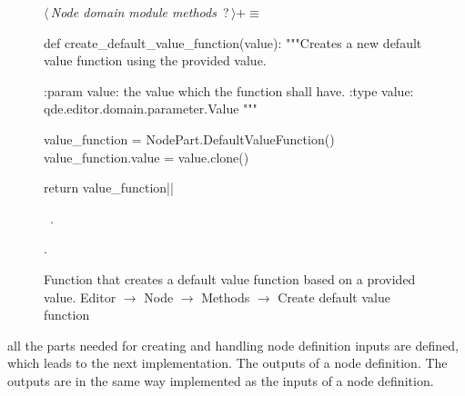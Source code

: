 \documentclass[%
    a4paper,    %
    justified,  %
    nobib,      %
    openany     %
]{tufte-book}
\makeatletter
\renewcommand{\label}[1]{\@tufte@label{##1}}%
\makeatother
\begin{document}
\begin{figure}
\begin{flushleft} \small
\begin{minipage}{\linewidth}\label{scrap136}\raggedright\small
{} $\langle\,${\itshape Node domain module methods}\nobreak\ {\footnotesize {?}}$\,\rangle+\equiv$
\vspace{-1ex}
\begin{pythoncode}
def create_default_value_function(value):
    """Creates a new default value function using the provided value.

    :param value: the value which the function shall have.
    :type  value: qde.editor.domain.parameter.Value
    """

    value_function = NodePart.DefaultValueFunction()
    value_function.value = value.clone()

    return value_function|\NWsep|
\end{pythoncode}
\vspace{1.5ex}
\footnotesize
\begin{list}{}{\setlength{\itemsep}{-\parsep}\setlength{\itemindent}{-\leftmargin}}
\item \NWtxtMacroDefBy\ .
\item {\NWtxtMacroNoRef}.

\item{}
\end{list}
\end{minipage}\vspace{4ex}
\end{flushleft}
\caption{Function that creates a default value function based on a provided
  value.
  \newline{}\newline{}Editor $\rightarrow$ Node $\rightarrow$
  Methods $\rightarrow$ Create default value function}
\label{editor:lst:node:create-default-value-function}
\end{figure}

 all the parts needed for creating and
handling node definition inputs are defined, which leads to the next
implementation. The outputs of a node definition. The outputs are in the same
way implemented as the inputs of a node definition.
\end{document}
